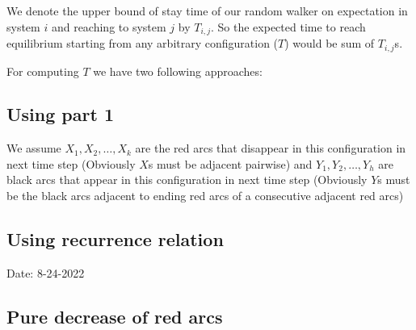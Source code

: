 \documentclass[]{book}
\theoremstyle{definition}
\begin{document}
We denote the upper bound of stay time of our random walker on expectation in system $i$ and reaching to system $j$ by $T_{i, j}$. So the expected time to reach equilibrium starting from any arbitrary configuration ($T$) would be sum of $T_{i,j}$s.



For computing $T$ we have two following approaches:
\subsection{Using  part 1}

We assume $X_1, X_2, \hdots, X_k$ are the red arcs that disappear in this configuration in next time step (Obviously $X$s must be adjacent pairwise) and $Y_1, Y_2, \hdots, Y_h$  are black arcs that appear in this configuration in next time step (Obviously $Y$s must be the black arcs adjacent to ending red arcs of a consecutive adjacent red arcs)


\subsection{Using recurrence relation}

\newpage
\begin{center}
Date: 8-24-2022
\end{center}

\subsection{Pure decrease of red arcs}
\end{document}
